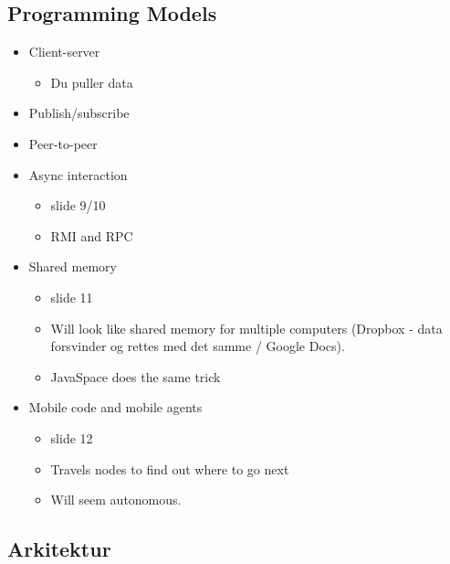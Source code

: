 \documentclass[10pt, a4]{Memoir}
\begin{document}
\subsection{Programming Models}
\begin{itemize}
\item Client-server
	\begin{itemize}
	\item Du puller data
	\end{itemize}

\item Publish/subscribe
\item Peer-to-peer
\item Async interaction
	\begin{itemize}
	\item slide 9/10
	\item RMI and RPC
	\end{itemize}

\item Shared memory
	\begin{itemize}
	\item slide 11
	\item Will look like shared memory for multiple computers (Dropbox - data forsvinder og rettes med det samme / Google Docs).
	\item JavaSpace does the same trick
	\end{itemize}

\item Mobile code and mobile agents
	\begin{itemize}
	\item slide 12
	\item Travels nodes to find out where to go next
	\item Will seem autonomous.
	\end{itemize}

\end{itemize}


\subsection{Arkitektur}
\end{document}
